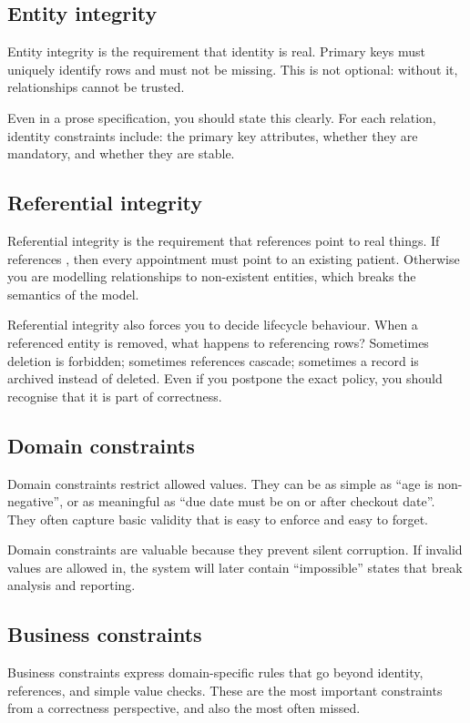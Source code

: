 \subsection{Entity integrity}
Entity integrity is the requirement that identity is real.
Primary keys must uniquely identify rows and must not be missing.
This is not optional: without it, relationships cannot be trusted.

Even in a prose specification, you should state this clearly.
For each relation, identity constraints include:
the primary key attributes, whether they are mandatory, and whether they are stable.

\subsection{Referential integrity}
Referential integrity is the requirement that references point to real things.
If  references , then every appointment must point to an existing patient.
Otherwise you are modelling relationships to non-existent entities, which breaks the semantics of the model.

Referential integrity also forces you to decide lifecycle behaviour.
When a referenced entity is removed, what happens to referencing rows?
Sometimes deletion is forbidden; sometimes references cascade; sometimes a record is archived instead of deleted.
Even if you postpone the exact policy, you should recognise that it is part of correctness.

\subsection{Domain constraints}
Domain constraints restrict allowed values.
They can be as simple as “age is non-negative”, or as meaningful as “due date must be on or after checkout date”.
They often capture basic validity that is easy to enforce and easy to forget.

Domain constraints are valuable because they prevent silent corruption.
If invalid values are allowed in, the system will later contain “impossible” states that break analysis and reporting.

\subsection{Business constraints}
Business constraints express domain-specific rules that go beyond identity, references, and simple value checks.
These are the most important constraints from a correctness perspective, and also the most often missed.

